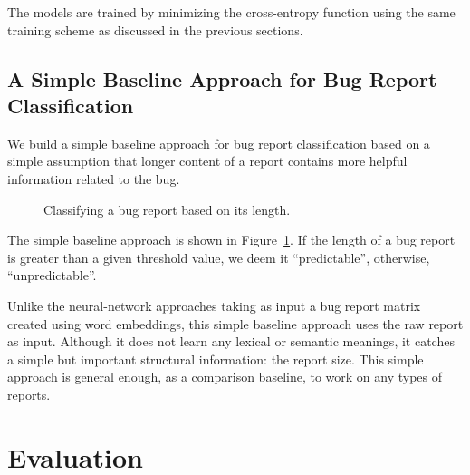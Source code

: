 The models are trained by minimizing the cross-entropy function using the same training scheme as discussed in the previous sections.

\subsection{A Simple Baseline Approach for Bug Report Classification}
\label{sec:simple baseline}
We build a simple baseline approach for bug report classification based on a simple assumption that longer content of a report contains more helpful information related to the bug.

\begin{figure}[ht]
\begin{center}
\caption{Classifying a bug report based on its length.}
\label{fig:simple baseline}
\end{center}
\end{figure}

The simple baseline approach is shown in Figure~\ref{fig:simple baseline}. If the length of a bug report is greater than a given threshold value, we deem it ``predictable'', otherwise, ``unpredictable''.

Unlike the neural-network approaches taking as input a bug report matrix created using word embeddings, this simple baseline approach uses the raw report as input. Although it does not learn any lexical or semantic meanings, it catches a simple but important structural information: the report size. This simple approach is general enough, as a comparison baseline, to work on any types of reports.

\section{Evaluation}
\label{sec:evaluation}

